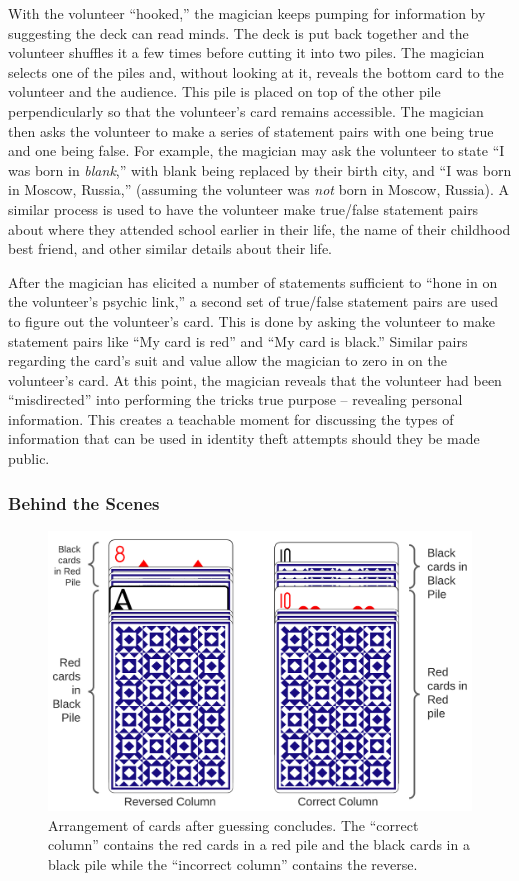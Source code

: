 With the volunteer ``hooked,'' the magician keeps pumping for information by
suggesting the deck can read minds.
The deck is put back together
and the volunteer shuffles it
a few times before cutting it into two piles.
The magician
selects one of the piles and, without looking at it,
reveals the bottom card to the volunteer and the
audience.
This pile is placed on top of the other pile perpendicularly so that
the volunteer's card remains accessible.  The magician then asks the volunteer to
make a series of statement pairs with one being true and one being false.  For
example,  the magician may ask the volunteer to state  ``I was born in
\textit{blank},'' with blank being replaced by their birth city, and ``I was
born in Moscow, Russia,'' (assuming the volunteer was \textit{not} born in Moscow,
Russia).  A similar process is used to have the volunteer make true/false
statement pairs about where they attended school earlier in their life, the name
of their childhood best friend, and other similar details about their life.

After the magician has elicited a number of statements sufficient to
``hone in on the volunteer's psychic link,''
a second set of true/false statement pairs are used
to figure out the volunteer's card.  This is done by asking the volunteer to make
statement pairs like ``My card is red'' and ``My card is black.''  Similar
pairs regarding the card's suit and value allow the magician to zero
in on the volunteer's card.
At this point, the magician reveals that the volunteer had been
``misdirected'' into performing the tricks true purpose -- revealing
personal information.  This creates a teachable moment for discussing
the types of information that can be used in identity theft attempts
should they
be made public.


\subsubsection{Behind the Scenes}

\begin{figure}[H]
\centering
\includegraphics[scale=.6]{images/Trick1}
\caption{Arrangement of cards after guessing concludes.  The ``correct column'' contains the red cards in a red pile and
the black cards in a black pile while the ``incorrect column'' contains the reverse.}
\label{fig:trick1}
\end{figure}

